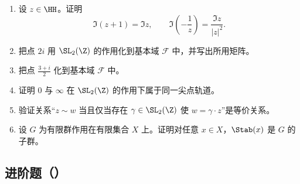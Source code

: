 \begin{enumerate}
  \item[\basic 20.] 设 $z\in\HH$。证明
  \[
  \Im(z+1)=\Im z,
  \qquad
  \Im\!\left(-\frac1z\right)=\frac{\Im z}{|z|^2}.
  \]
  \item[\basic 21.] 把点 $2i$ 用 $\SL_2(\Z)$ 的作用化到基本域 $\mathcal F$ 中，并写出所用矩阵。
  \item[\basic 22.] 把点 $\frac{3+i}{2}$ 化到基本域 $\mathcal F$ 中。
  \item[\basic 23.] 证明 $0$ 与 $\infty$ 在 $\SL_2(\Z)$ 的作用下属于同一尖点轨道。
  \item[\basic 24.] 验证关系“$z\sim w$ 当且仅当存在 $\gamma\in\SL_2(\Z)$ 使 $w=\gamma\cdot z$”是等价关系。
  \item[\basic 25.] 设 $G$ 为有限群作用在有限集合 $X$ 上。证明对任意 $x\in X$，$\Stab(x)$ 是 $G$ 的子群。
\end{enumerate}

\subsection*{进阶题（\medium）}

